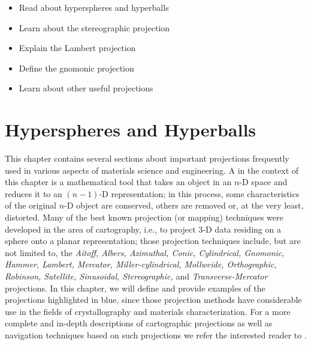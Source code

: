 \begin{learningobjectives}
{\begin{itemize}
    \item[{\color{OCBurntOrange}\ref{\chabbr:sec:intro}:}] Read about hyperspheres and hyperballs
    \item[{\color{OCBurntOrange}\ref{\chabbr:sec:stereoproj}:}] Learn about the stereographic projection
    \item[{\color{OCBurntOrange}\ref{\chabbr:sec:lambertproj}:}] Explain the Lambert projection
    \item[{\color{OCBurntOrange}\ref{\chabbr:sec:gnomonicproj}:}] Define the gnomonic projection
    \item[{\color{OCBurntOrange}\ref{\chabbr:sec:otherprojections}:}] Learn about other useful projections
\end{itemize}}
\end{learningobjectives}



\section{Hyperspheres and Hyperballs}\label{\chabbr:sec:intro}

This chapter contains several sections about important projections frequently used in various aspects of materials science and engineering.  A  in the context of this chapter is a mathematical tool that takes an object in an $n$-D space and reduces it to an $(n-1)$-D representation; in this process, some characteristics of the original $n$-D object are conserved, others are removed or, at the very least, distorted.  Many of the best known projection (or mapping) techniques were developed in the area of cartography, i.e., to project 3-D data residing on a sphere onto a planar representation; those projection techniques include, but are not limited to, the \textit{Aitoff, Albers, Azimuthal, Conic, Cylindrical, {\color{OCHighlandsSkyBlue}Gnomonic}, Hammer, {\color{OCHighlandsSkyBlue}Lambert}, Mercator, Miller-cylindrical, Mollweide, Orthographic, Robinson, Satellite, Sinusoidal, {\color{OCHighlandsSkyBlue}Stereographic},} and \textit{Transverse-Mercator} projections.  In this chapter, we will define and provide examples of the projections highlighted in blue, since those projection methods have considerable use in the fields of crystallography and materials characterization.  For a more complete and in-depth descriptions of cartographic projections as well as navigation techniques based on such projections we refer the interested reader to \cite{bowditch2016a}.

